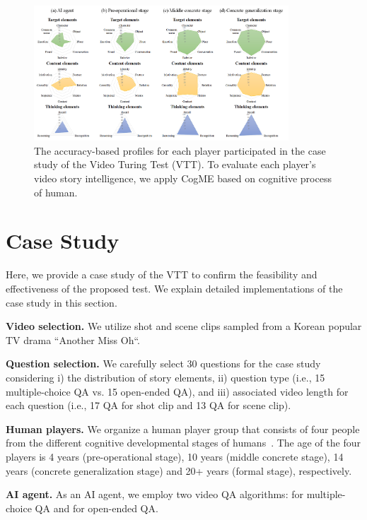 \documentclass[letterpaper]{article} %
\begin{document}
\begin{figure}[t]
\centering
\includegraphics[width=0.85\textwidth]{fig/cogme_analysis.png}
\caption{The accuracy-based profiles for each player participated in the case study of the Video Turing Test (VTT). To evaluate each player's video story intelligence, we apply CogME based on cognitive process of human.}
\label{fig:analysis}
\end{figure}

\section{Case Study}
Here, we provide a case study of the VTT to confirm the feasibility and effectiveness of the proposed test. We explain detailed implementations of the case study in this section.

\noindent \textbf{Video selection.  } We utilize shot and scene clips sampled from a Korean popular TV drama ``Another Miss Oh``.

\noindent \textbf{Question selection.  }
We carefully select 30 questions for the case study considering i) the distribution of story elements, ii) question type (i.e., 15 multiple-choice QA vs. 15 open-ended QA), and iii) associated video length for each question (i.e., 17 QA for shot clip and 13 QA for scene clip).

\noindent \textbf{Human players.  }
We organize a human player group that consists of four people from the different cognitive developmental stages of humans~\cite{hierarchicalQnA2019heo}. The age of the four players is 4 years (pre-operational stage), 10 years (middle concrete stage), 14 years (concrete generalization stage) and 20+ years (formal stage), respectively.

\noindent \textbf{AI agent.  }
As an AI agent, we employ two video QA algorithms: \cite{choi2021dramaqa} for multiple-choice QA and \cite{lee2021mounting} for open-ended QA.
\end{document}
